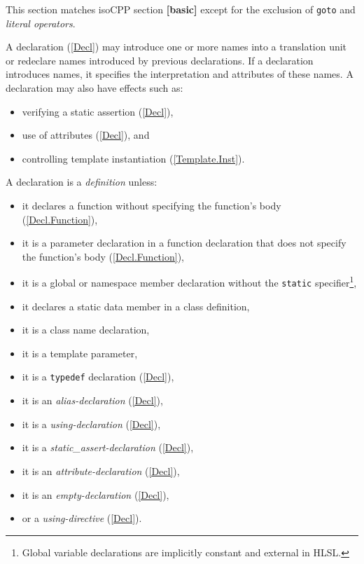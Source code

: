 \p \begin{note}
  This section matches \gls{isoCPP} section \textbf{[basic]} except for the
  exclusion of \texttt{goto} and \textit{literal operators}.
\end{note}


\p A declaration (\ref{Decl}) may introduce one or more names into a translation
unit or redeclare names introduced by previous declarations. If a declaration
introduces names, it specifies the interpretation and attributes of these names.
A declaration may also have effects such as:
\begin{itemize}
\item verifying a static assertion (\ref{Decl}),
\item use of attributes (\ref{Decl}), and
\item controlling template instantiation (\ref{Template.Inst}).
\end{itemize}

\p A declaration is a \textit{definition} unless:
\begin{itemize}
\item it declares a function without specifying the function's body
(\ref{Decl.Function}),
\item it is a parameter declaration in a function declaration that does not
specify the function's body (\ref{Decl.Function}),
\item it is a global or namespace member declaration without the \texttt{static}
specifier\footnote{Global variable declarations are implicitly constant and
external in HLSL.},
\item it declares a static data member in a class definition,
\item it is a class name declaration,
\item it is a template parameter,
\item it is a \texttt{typedef} declaration (\ref{Decl}),
\item it is an \textit{alias-declaration} (\ref{Decl}),
\item it is a \textit{using-declaration} (\ref{Decl}),
\item it is a \textit{static\_assert-declaration} (\ref{Decl}),
\item it is an \textit{attribute-declaration} (\ref{Decl}),
\item it is an \textit{empty-declaration} (\ref{Decl}),
\item or a \textit{using-directive} (\ref{Decl}).
\end{itemize}

